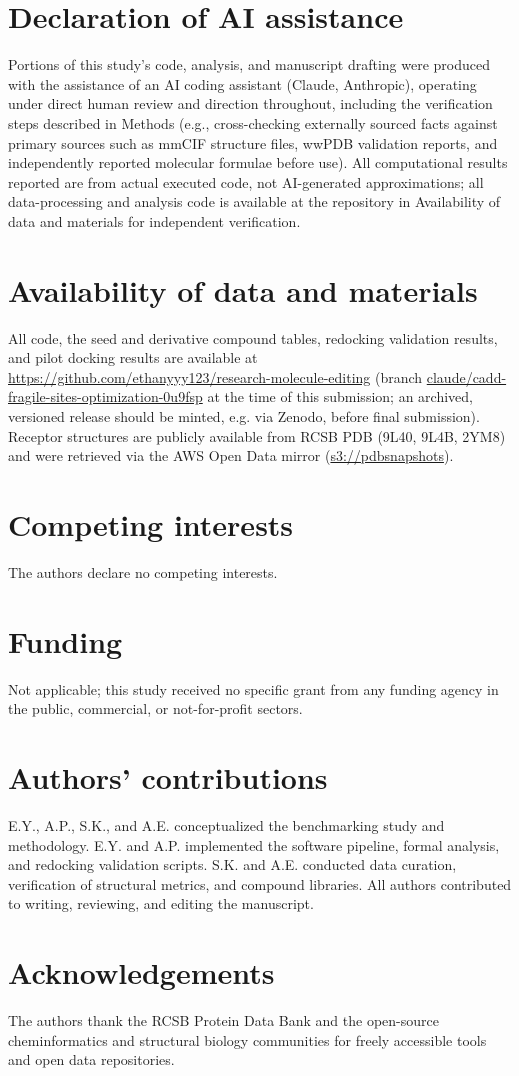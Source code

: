 \documentclass[11pt]{article}
\begin{document}
\section*{Declaration of AI assistance}
Portions of this study's code, analysis, and manuscript drafting were
produced with the assistance of an AI coding assistant (Claude, Anthropic),
operating under direct human review and direction throughout, including
the verification steps described in Methods (e.g., cross-checking
externally sourced facts against primary sources such as mmCIF structure
files, wwPDB validation reports, and independently reported molecular
formulae before use). All computational results reported are from actual
executed code, not AI-generated approximations; all data-processing and
analysis code is available at the repository in Availability of data and
materials for independent verification.

\section*{Availability of data and materials}
All code, the seed and derivative compound tables, redocking validation
results, and pilot docking results are available at
\url{https://github.com/ethanyyy123/research-molecule-editing}
(branch \url{claude/cadd-fragile-sites-optimization-0u9fsp} at the time
of this submission; an archived, versioned release should be minted, e.g.
via Zenodo, before final submission). Receptor structures are publicly
available from RCSB PDB (9L40, 9L4B, 2YM8) and were retrieved via the AWS
Open Data mirror (\url{s3://pdbsnapshots}).

\section*{Competing interests}
The authors declare no competing interests.

\section*{Funding}
Not applicable; this study received no specific grant from any funding agency in the public, commercial, or not-for-profit sectors.

\section*{Authors' contributions}
E.Y., A.P., S.K., and A.E. conceptualized the benchmarking study and methodology. E.Y. and A.P. implemented the software pipeline, formal analysis, and redocking validation scripts. S.K. and A.E. conducted data curation, verification of structural metrics, and compound libraries. All authors contributed to writing, reviewing, and editing the manuscript.

\section*{Acknowledgements}
The authors thank the RCSB Protein Data Bank and the open-source cheminformatics and structural biology communities for freely accessible tools and open data repositories.


\end{document}
